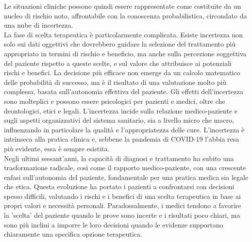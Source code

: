 Le situazioni cliniche possono quindi essere rappresentate come costituite da un nucleo di rischio noto, affrontabile con la conoscenza probabilistica, circondato da una nube di incertezza.\\


La fase di scelta terapeutica è particolarmente complicata. Esiste incertezza non solo sui dati oggettivi che dovrebbero guidare la selezione del trattamento più appropriato in termini di rischio e beneficio, ma anche sulla percezione soggettiva del paziente rispetto a queste scelte, e sul valore che attribuisce ai potenziali rischi e benefici. La decisione più efficace non emerge da un calcolo matematico delle probabilità di successo, ma è il risultato di una valutazione molto più complessa, basata sull'autonomia effettiva del paziente. 
Gli effetti dell'incertezza sono molteplici e possono essere psicologici per pazienti e medici, oltre che deontologici, etici e legali. L'incertezza incide sulla relazione medico-paziente e sugli aspetti organizzativi del sistema sanitario, sia a livello micro che macro, influenzando in particolare la qualità e l'appropriatezza delle cure.
L'incertezza è intrinseca alla pratica clinica e, sebbene la pandemia di COVID-19 l'abbia resa più evidente, essa è sempre esistita.\\

Negli ultimi sessant'anni, la capacità di diagnosi e trattamento ha subito una trasformazione radicale, così come il rapporto medico-paziente, con una crescente enfasi sull'autonomia del paziente, fondamentale per una pratica medica sia legale che etica. Questa evoluzione ha portato i pazienti a confrontarsi con decisioni spesso difficili, valutando i rischi e i benefici di una scelta terapeutica in base ai propri valori e necessità personali. Paradossalmente, i medici tendono a favorire la 'scelta' del paziente quando le prove sono incerte e i risultati poco chiari, ma sono più inclini a imporre le loro decisioni quando le evidenze supportano chiaramente una specifica opzione terapeutica.



